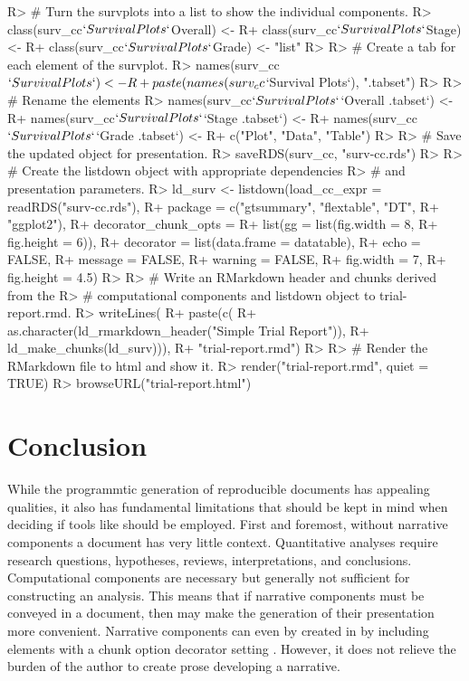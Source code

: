 \documentclass[
]{jss}
\begin{document}
\begin{CodeChunk}

\begin{CodeInput}
R> # Turn the survplots into a list to show the individual components.
R> class(surv_cc$`Survival Plots`$Overall) <- 
R+   class(surv_cc$`Survival Plots`$Stage) <-
R+   class(surv_cc$`Survival Plots`$Grade) <- "list"
R> 
R> # Create a tab for each element of the survplot.
R> names(surv_cc$`Survival Plots`) <- 
R+   paste(names(surv_cc$`Survival Plots`), "{.tabset}")
R> 
R> # Rename the elements
R> names(surv_cc$`Survival Plots`$`Overall {.tabset}`) <- 
R+   names(surv_cc$`Survival Plots`$`Stage {.tabset}`) <- 
R+   names(surv_cc$`Survival Plots`$`Grade {.tabset}`) <- 
R+   c("Plot", "Data", "Table")
R>   
R> # Save the updated object for presentation.
R> saveRDS(surv_cc, "surv-cc.rds")
R> 
R> # Create the listdown object with appropriate dependencies
R> # and presentation parameters.
R> ld_surv <- listdown(load_cc_expr = readRDS("surv-cc.rds"),
R+                     package = c("gtsummary", "flextable", "DT", 
R+                                 "ggplot2"),
R+                     decorator_chunk_opts = 
R+                       list(gg = list(fig.width = 8,
R+                                      fig.height = 6)),
R+                     decorator = list(data.frame = datatable),
R+                     echo = FALSE,
R+                     message = FALSE,
R+                     warning = FALSE,
R+                     fig.width = 7,
R+                     fig.height = 4.5)
R> 
R> # Write an RMarkdown header and chunks derived from the 
R> # computational components and listdown object to trial-report.rmd.
R> writeLines(
R+   paste(c(
R+     as.character(ld_rmarkdown_header("Simple Trial Report")),
R+     ld_make_chunks(ld_surv))),
R+   "trial-report.rmd")
R> 
R> # Render the RMarkdown file to html and show it.
R> render("trial-report.rmd", quiet = TRUE)
R> browseURL("trial-report.html")
\end{CodeInput}
\end{CodeChunk}

\hypertarget{conclusion}{%
\section{Conclusion}\label{conclusion}}

While the programmtic generation of reproducible documents has appealing
qualities, it also has fundamental limitations that should be kept in
mind when deciding if tools like  should be employed.
First and foremost, without narrative components a document has very
little context. Quantitative analyses require research questions,
hypotheses, reviews, interpretations, and conclusions. Computational
components are necessary but generally not sufficient for constructing
an analysis. This means that if narrative components must be conveyed in
a document, then  may make the generation of their
presentation more convenient. Narrative components can even by created
in  by including  elements with a chunk
option decorator setting . However, it does not
relieve the burden of the author to create prose developing a narrative.
\end{document}
